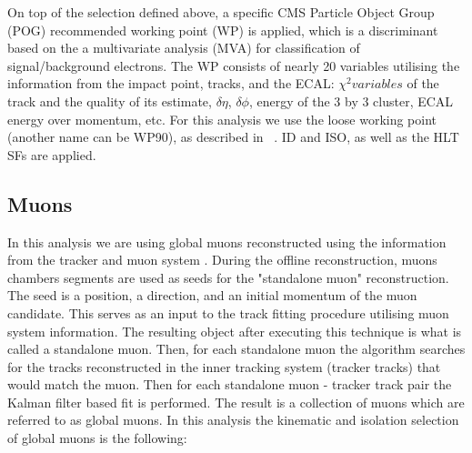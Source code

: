         On top of the selection defined above, a specific CMS Particle Object Group (POG) recommended working point (WP) is applied, which is a discriminant based on the a multivariate analysis (MVA) for classification of signal/background electrons. The WP consists of nearly 20 variables utilising the information from the impact point, tracks, and the ECAL: $\chi^2 variables$ of the track and the quality of its estimate, $\delta \eta$, $\delta \phi$, energy of the 3 by 3 cluster, ECAL energy over momentum, etc. For this analysis we use the loose working point (another name can be WP90), as described in ~\cite{vhbbAN}. ID and ISO, as well as the HLT SFs are applied.



\subsection{Muons\label{sec:muons}}
        In this analysis we are using global muons reconstructed using the information from the tracker and muon system \cite{CMS-PAS-MUO-10-002,Chatrchyan:2012xi}. During the offline reconstruction, muons chambers segments are used as seeds for the "standalone muon" reconstruction. The seed is a position, a direction, and an initial momentum of the muon candidate. This serves as an input to the track fitting procedure utilising muon system information. The resulting object after executing this technique is what is called a standalone muon. Then, for each standalone muon the algorithm searches for the tracks reconstructed in the inner tracking system (tracker tracks) that would match the muon. Then for each standalone muon - tracker track pair the Kalman filter based fit \cite{Lenzi:2013xpa} is performed. The result is a collection of muons which are referred to as global muons. In this analysis the kinematic and isolation selection of global muons is the following:
        
